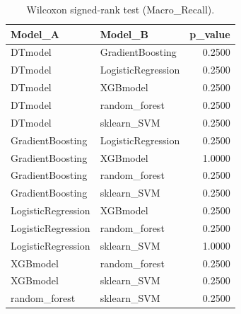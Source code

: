 \begin{table}[t]
\centering
\begin{tabular}{llr}
\toprule
Model_A & Model_B & p_value \\
\midrule
DTmodel & GradientBoosting & 0.2500 \\
DTmodel & LogisticRegression & 0.2500 \\
DTmodel & XGBmodel & 0.2500 \\
DTmodel & random_forest & 0.2500 \\
DTmodel & sklearn_SVM & 0.2500 \\
GradientBoosting & LogisticRegression & 0.2500 \\
GradientBoosting & XGBmodel & 1.0000 \\
GradientBoosting & random_forest & 0.2500 \\
GradientBoosting & sklearn_SVM & 0.2500 \\
LogisticRegression & XGBmodel & 0.2500 \\
LogisticRegression & random_forest & 0.2500 \\
LogisticRegression & sklearn_SVM & 1.0000 \\
XGBmodel & random_forest & 0.2500 \\
XGBmodel & sklearn_SVM & 0.2500 \\
random_forest & sklearn_SVM & 0.2500 \\
\bottomrule
\end{tabular}
\caption{Wilcoxon signed-rank test (Macro_Recall).}
\label{tab:wilcoxon_Macro_Recall}
\end{table}